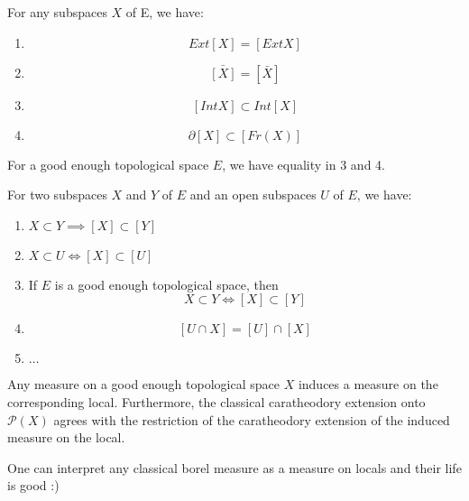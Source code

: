 \begin{lemma}[Part 3]
    \label{lem:subspaces_part_3}
    For any subspaces $X$ of E, we have:
    \begin{enumerate}
        \item \[Ext[X] = [Ext X]\]
        \item \[\bar{[X]} = [\bar{X}]\]
        \item \[[Int X] \subset Int[X]\]
        \item \[\partial[X] \subset [Fr(X)]\]
    \end{enumerate}
    For a good enough topological space $E$, we have equality in 3 and 4.
\end{lemma}


\begin{proposition}
    \label{prop:subset_to_sublocal_structure}
    For two subspaces $X$ and $Y$ of $E$ and an open subspaces $U$ of $E$, we have:
    \begin{enumerate}
        \item $X \subset Y \implies [X] \subset [Y]$
        \item $X \subset U \iff [X] \subset [U]$
        \item If $E$ is a good enough topological space, then \[X \subset Y \iff [X] \subset [Y]\]
        \item \[[U \cap X] = [U] \cap [X]\]
        \item $\dots$
    \end{enumerate}

\end{proposition}

\begin{theorem}
    \label{thm:measure_top_to_loc}
    Any measure on a good enough topological space $X$ induces a measure on the corresponding local. Furthermore, the classical caratheodory extension onto $\mathcal{P}(X)$ agrees with the restriction of the caratheodory extension of the induced measure on the local.
\end{theorem}

\begin{theorem}[Goal]
    \label{thm:goal}
    One can interpret any classical borel measure as a measure on locals and their life is good :)
\end{theorem}




